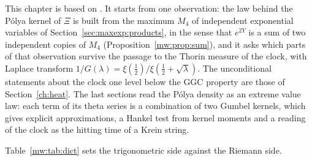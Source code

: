 \label{chap:maxwald}

This chapter is based on \cite{P26mw}. It starts from one observation: the law behind the P\'olya kernel of $\Xi$ is built from the maximum $M_4$ of independent exponential variables of Section~\ref{sec:maxexp:products}, in the sense that $e^{2Y}$ is a sum of two independent copies of $M_4$ (Proposition~\ref{mw:prop:sum}), and it asks which parts of that observation survive the passage to the Thorin measure of the clock, with Laplace transform $1/G(\lambda)=\xi(\frac12)/\xi(\frac12+\sqrt\lambda)$. The unconditional statements about the clock one level below the GGC property are those of Section~\ref{ch:heat}. The last sections read the P\'olya density as an extreme value law: each term of its theta series is a combination of two Gumbel kernels, which gives explicit approximations, a Hankel test from kernel moments and a reading of the clock as the hitting time of a Krein string.

Table~\ref{mw:tab:dict} sets the trigonometric side against the Riemann side.

